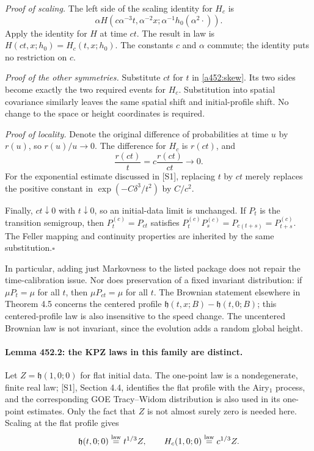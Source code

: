 \documentclass[11pt]{article}
\begin{document}
\emph{Proof of scaling.} The left side of the scaling identity for $H_c$
is
\[
 \alpha H(c\alpha^{-3}t,\alpha^{-2}x;
                  \alpha^{-1}h_0(\alpha^2\cdot)).
\]
Apply the identity for $H$ at time $ct$. The result in law is
$H(ct,x;h_0)=H_c(t,x;h_0)$. The constants $c$ and $\alpha$ commute;
the identity puts no restriction on $c$.

\emph{Proof of the other symmetries.} Substitute $ct$ for $t$ in
\eqref{a452:skew}. Its two sides become exactly the two required events
for $H_c$. Substitution into spatial covariance similarly leaves the
same spatial shift and initial-profile shift. No change to the space or
height coordinates is required.

\emph{Proof of locality.} Denote the original difference of probabilities
at time $u$ by $r(u)$, so $r(u)/u\to0$. The difference for $H_c$ is
$r(ct)$, and
\[
 \frac{r(ct)}t=c\frac{r(ct)}{ct}\longrightarrow0.
\]
For the exponential estimate discussed in [S1], replacing $t$ by $ct$
merely replaces the positive constant in
$\exp(-C\delta^3/t^2)$ by $C/c^2$.

Finally, $ct\downarrow0$ with $t\downarrow0$, so an initial-data limit
is unchanged. If $P_t$ is the transition semigroup, then
$P_t^{(c)}=P_{ct}$ satisfies
$P_t^{(c)}P_s^{(c)}=P_{c(t+s)}=P_{t+s}^{(c)}$.
The Feller mapping and continuity properties are inherited by the same
substitution.\hfill$\square$

In particular, adding just Markovness to the listed package does not
repair the time-calibration issue. Nor does preservation of a fixed
invariant distribution: if $\mu P_t=\mu$ for all $t$, then
$\mu P_{ct}=\mu$ for all $t$. The Brownian statement elsewhere in
Theorem 4.5 concerns the centered profile
$\mathfrak h(t,x;B)-\mathfrak h(t,0;B)$; this centered-profile law is
also insensitive to the speed change. The uncentered Brownian law is
not invariant, since the evolution adds a random global height.

\paragraph{Lemma 452.2: the KPZ laws in this family are distinct.}
Let $Z=\mathfrak h(1,0;0)$ for flat initial data. The one-point law is
a nondegenerate, finite real law; [S1], Section 4.4, identifies the flat
profile with the Airy$_1$ process, and the corresponding GOE
Tracy--Widom distribution is also used in its one-point estimates.
Only the fact that $Z$ is not almost surely zero is needed here.
Scaling at the flat profile gives
\[
 \mathfrak h(t,0;0)\overset{\rm law}=t^{1/3}Z,
 \qquad H_c(1,0;0)\overset{\rm law}=c^{1/3}Z.
\]
\end{document}
